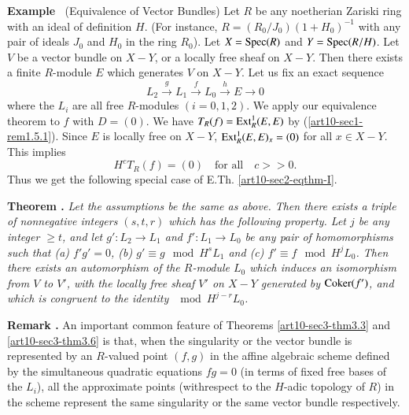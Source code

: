 \medskip
\noindent
{\bf Example \label{art10-sec3-exam-II}}~(Equivalence of Vector Bundles)
Let $R$ be any noetherian Zariski ring with an ideal of definition $H$. (For instance, $R=(R_{0}/J_{0})(1+H_{0})^{-1}$ with any pair of ideals $J_{0}$ and $H_{0}$ in the ring $R_{0}$). Let $X=\operatorname{Spec} (R)$ and $Y=\operatorname{Spec} (R/H)$. Let $V$ be a vector bundle on $X-Y$, or a locally free sheaf on $X-Y$. Then there exists a finite $R$-module $E$ which generates $V$ on $X-Y$. Let us fix an exact sequence
\begin{equation*}
L_{2}\xrightarrow{g}L_{1}\xrightarrow{f}L_{0}\xrightarrow{h}E\to 0\tag{3.4}\label{art10-sec3-eq3.4}
\end{equation*}
where the $L_{i}$ are all free $R$-modules $(i=0,1,2)$. We apply our equivalence theorem to $f$ with $D=(0)$. We have $T_{R}(f)=\operatorname{\mathrm{Ext}}^{1}_{R}(E,E)$ by (\ref{art10-sec1-rem1.5.1}). Since $E$ is locally free on $X-Y$, $\operatorname{\mathrm{Ext}}^{1}_{R}(E,E)_{x}=(0)$ for all $x\in X-Y$. This implies
\begin{equation*}
H^{c}T_{R}(f)=(0)\text{~~ for all~~ } c>>0.\tag{3.5}\label{art10-sec3-eq3.5}
\end{equation*}
Thus we get the following special case of E.Th. \ref{art10-sec2-eqthm-I}.

\medskip
\noindent
{\bf Theorem .\label{art10-sec3-thm3.6}}
{\em Let the assumptions be the same as above. Then there exists a triple of nonnegative integers $(s,t,r)$ which has the following property. Let $j$ be any integer $\geq t$, and let $g':L_{2}\to L_{1}$ and $f':L_{1}\to L_{0}$ be any pair of homomorphisms such that {\rm(a)} $f'g'=0$, {\rm(b)} $g'\equiv g\mod H^{s}L_{1}$ and {\rm(c)} $f'\equiv f\mod H^{j}L_{0}$. Then there exists an automorphism of the $R$-module $L_{0}$ which induces an isomorphism from $V$ to $V'$, with the locally free sheaf $V'$ on $X-Y$ generated by $\operatorname{\mathrm{Coker}} (f')$, and which is congruent to the identity $\mod H^{j-r}L_{0}$.}

\medskip
\noindent
{\bf Remark .\label{art10-sec3-rem3.7}}
An important common feature of Theorems \ref{art10-sec3-thm3.3} and \ref{art10-sec3-thm3.6} is that, when the singularity or the vector bundle is represented by an $R$-valued point $(f,g)$ in the affine algebraic scheme defined by the simultaneous quadratic equations $fg=0$ (in terms of fixed free bases of the $L_{i}$), all the approximate points (with\pageoriginale respect to the $H$-adic topology of $R$) in the scheme represent the same singularity or the same vector bundle respectively.

